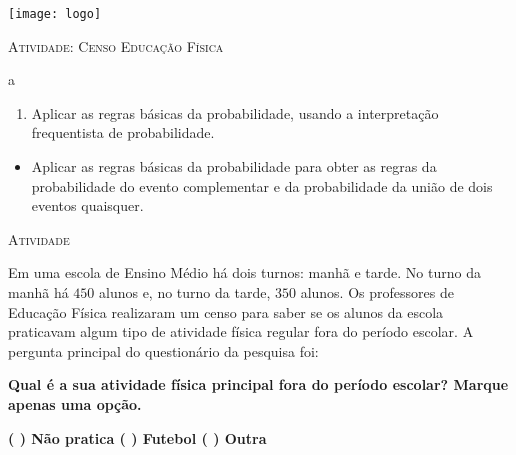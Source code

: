 \documentclass[10 pt,usenames,dvipsnames, oneside]{article}
\begin{document}
\begin{center}
  \begin{minipage}[l]{3cm}
\texttt{[image: logo]}    
\end{minipage}\hfill
\begin{minipage}[r]{.8\textwidth}
 {\Large \scshape Atividade: Censo Educação Física}  
\end{minipage}
\end{center}
\vspace{.2cm}

\ifdefined\prof
\begin{objetivos}
\item a
\end{objetivos}

\begin{goals}
\begin{enumerate}
\item Aplicar as regras básicas da probabilidade, usando a interpretação frequentista de probabilidade.
\end{enumerate}

\tcblower

\begin{itemize}
\item Aplicar as regras básicas da probabilidade para obter as regras da probabilidade do evento complementar e da probabilidade da união de dois eventos quaisquer.
\end{itemize}
\end{goals}

\bigskip
\begin{center}
{\large \scshape Atividade}
\end{center}
\fi

Em uma escola de Ensino Médio há dois turnos: manhã e tarde. No turno da manhã há $450$ alunos e, no turno da tarde, $350$ alunos. Os professores de Educação Física realizaram um censo para saber se os alunos da escola praticavam algum tipo de atividade física regular fora do período escolar. A pergunta principal do questionário da pesquisa foi:

\textbf{Qual é a sua atividade física principal fora do período escolar? Marque apenas uma opção.}


\begin{center}\textbf{({ }) Não pratica  ({ }) Futebol ({ }) Outra}\end{center}
\end{document}
